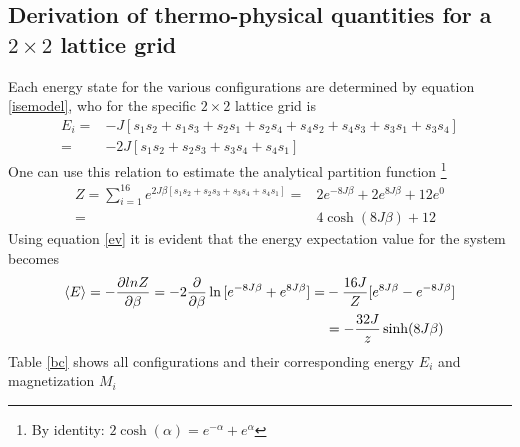 \documentclass[%
reprint,nofootinbib,
amsmath,amssymb,
aps,
]{revtex4-1}
\begin{document}
\subsection{Derivation of thermo-physical quantities for a $2\times 2$ lattice grid}
Each energy state for the various configurations are determined by equation \ref{isemodel}, who for the specific $2\times2$ lattice grid is
\begin{align*}
E_i  =& -J[s_1s_2 + s_1s_3 + s_2s_1+s_2s_4+s_4s_2+s_4s_3 + s_3s_1 + s_3s_4] \nonumber \\
= &-2J[s_1s_2 + s_2s_3 + s_3s_4 + s_4s_1]
\end{align*}\vspace{1mm} 
One can use this relation to estimate the analytical partition function \footnote{By identity: $2\cosh(\alpha) = e^{-\alpha} + e^{\alpha}$}
\begin{align*}
Z = \sum_{i = 1}^{16}e^{2J\beta[s_1s_2 + s_2s_3 + s_3s_4 + s_4s_1]}
=&  2e^{-8J\beta} + 2e^{8J\beta} + 12e^0\nonumber \\
= & 4\cosh(8J\beta) + 12 
\end{align*} 
Using equation \ref{ev} it is evident that the energy expectation value for the system becomes 
\begin{align*}
\expval{E} = -\dfrac{\partial ln Z}{\partial \beta} = -2\dfrac{\partial}{\partial \beta}\ln{[e^{-8J\beta} + e^{8J\beta}]} =& -\dfrac{16J}{Z}[e^{8J\beta} - e^{-8J\beta}] \\ 
& = -\dfrac{32J}{z}\sinh(8J\beta)
\end{align*}
Table \ref{bc} shows all configurations and their corresponding energy $E_i$ and magnetization $M_i$
\end{document}
